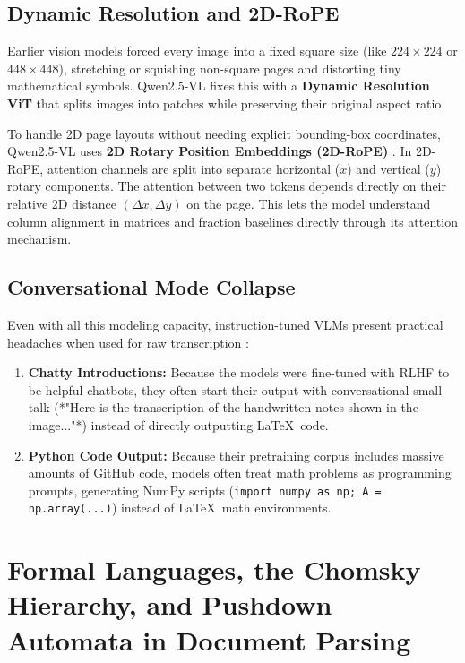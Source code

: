 \subsection{Dynamic Resolution and 2D-RoPE}
Earlier vision models forced every image into a fixed square size (like $224 \times 224$ or $448 \times 448$), stretching or squishing non-square pages and distorting tiny mathematical symbols. Qwen2.5-VL fixes this with a \textbf{Dynamic Resolution ViT} that splits images into patches while preserving their original aspect ratio.

To handle 2D page layouts without needing explicit bounding-box coordinates, Qwen2.5-VL uses \textbf{2D Rotary Position Embeddings (2D-RoPE)} \cite{su2024roformer}. In 2D-RoPE, attention channels are split into separate horizontal ($x$) and vertical ($y$) rotary components. The attention between two tokens depends directly on their relative 2D distance $(\Delta x, \Delta y)$ on the page. This lets the model understand column alignment in matrices and fraction baselines directly through its attention mechanism.

\subsection{Conversational Mode Collapse}
Even with all this modeling capacity, instruction-tuned VLMs present practical headaches when used for raw transcription \cite{chen2024hallucination}:
\begin{enumerate}
    \item \textbf{Chatty Introductions:} Because the models were fine-tuned with RLHF to be helpful chatbots, they often start their output with conversational small talk (*"Here is the transcription of the handwritten notes shown in the image..."*) instead of directly outputting \LaTeX\ code.
    \item \textbf{Python Code Output:} Because their pretraining corpus includes massive amounts of GitHub code, models often treat math problems as programming prompts, generating NumPy scripts (\texttt{import numpy as np; A = np.array(...)}) instead of \LaTeX\ math environments.
\end{enumerate}

\section{Formal Languages, the Chomsky Hierarchy, and Pushdown Automata in Document Parsing}
\label{sec:formal_grammars_parsing}

